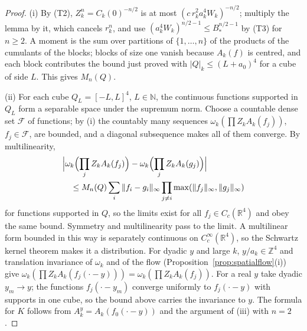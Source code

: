 \documentclass[11pt]{amsart}
\theoremstyle{definition}
\theoremstyle{remark}
\numberwithin{equation}{section}
\newcommand{\R}{\mathbb{R}}
\newcommand{\Z}{\mathbb{Z}}
\begin{document}
\begin{proof}
(i) By (T2), $Z_k^n=C_k(0)^{-n/2}$ is at most $(c\,r_k^2a_k^4W_k)^{-n/2}$;
multiply the lemma by it, which cancels $r_k^n$, and use
$(a_k^4W_k)^{n/2-1}\le B_*^{n/2-1}$ by (T3) for $n\ge2$. A
moment is the sum over partitions of $\{1,\dots,n\}$ of the products of the
cumulants of the blocks; blocks of size one vanish because $A_k(f)$ is
centred, and each block contributes the bound just proved with
$|Q|_k\le(L+a_0)^4$ for a cube of side $L$. This gives $M_n(Q)$.

(ii) For each cube $Q_L=[-L,L]^4$, $L\in\mathbb N$, the continuous functions
supported in $Q_L$ form a separable space under the supremum norm. Choose a
countable dense set $\mathcal F$ of functions; by (i) the countably many
sequences $\omega_k(\prod Z_kA_k(f_j))$, $f_j\in\mathcal F$, are bounded, and
a diagonal subsequence makes all of them converge. By multilinearity,
\[
\begin{split}
&\Bigl|\omega_k\Bigl(\prod_jZ_kA_k(f_j)\Bigr)
-\omega_k\Bigl(\prod_jZ_kA_k(g_j)\Bigr)\Bigr|\\
&\quad\le M_n(Q)\sum_i\|f_i-g_i\|_\infty
\prod_{j\ne i}\max(\|f_j\|_\infty,\|g_j\|_\infty)
\end{split}
\]
for functions supported in $Q$, so the limits exist for all $f_j\in C_c(\R^4)$
and obey the same bound. Symmetry and multilinearity pass to the limit. A
multilinear form bounded in this way is separately continuous on
$C^\infty_c(\R^4)$, so the Schwartz kernel theorem makes it a distribution.
For dyadic $y$ and large $k$, $y/a_k\in\Z^4$ and translation invariance of
$\omega_k$ and of the flow (Proposition~\ref{prop:spatialflow}(i)) give
$\omega_k(\prod Z_kA_k(f_j(\cdot-y)))=\omega_k(\prod Z_kA_k(f_j))$. For a real
$y$ take dyadic $y_m\to y$; the functions $f_j(\cdot-y_m)$ converge uniformly
to $f_j(\cdot-y)$ with supports in one cube, so the bound above carries the
invariance to $y$. The formula for $K$ follows from $A^y_k=A_k(f_0(\cdot-y))$
and the argument of (iii) with $n=2$.


\end{proof}
\end{document}
